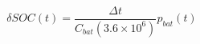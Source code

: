 \begin{equation}
	\delta SOC(t) = \frac{\Delta t}{C_{bat}\left(3.6\times10^6\right)}p_{bat}(t)
	\label{ch2:equ:soc-equation-from-battery-power}
\end{equation}